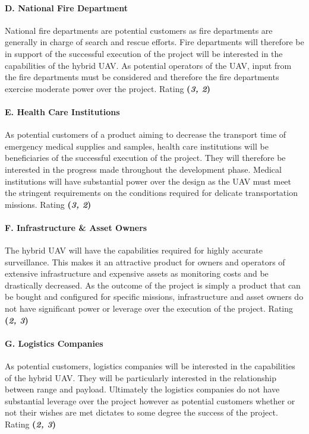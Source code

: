 \paragraph{D. National Fire Department}
National fire departments are potential customers as fire departments are generally in charge of search and rescue efforts. Fire departments will therefore be in support of the successful execution of the project will be interested in the capabilities of the hybrid UAV. As potential operators of the UAV, input from the fire departments must be considered and therefore the fire departments exercise moderate power over the project. Rating \textbf{(\textit{3, 2})} 

\paragraph{E. Health Care Institutions}
As potential customers of a product aiming to decrease the transport time of emergency medical supplies and samples, health care institutions will be beneficiaries of the successful execution of the project. They will therefore be interested in the progress made throughout the development phase. Medical institutions will have substantial power over the design as the UAV must meet the stringent requirements on the conditions required for delicate transportation missions. Rating \textbf{(\textit{3, 2})} 

\paragraph{F. Infrastructure \& Asset Owners}
The hybrid UAV will have the capabilities required for highly accurate surveillance. This makes it an attractive product for owners and operators of extensive infrastructure and expensive assets as monitoring costs and be drastically decreased. As the outcome of the project is simply a product that can be bought and configured for specific missions, infrastructure and asset owners do not have significant power or leverage over the execution of the project. Rating \textbf{(\textit{2, 3})} 

\paragraph{G. Logistics Companies}
As potential customers, logistics companies will be interested in the capabilities of the hybrid UAV. They will be particularly interested in the relationship between range and payload. Ultimately the logistics companies do not have substantial leverage over the project however as potential customers whether or not their wishes are met dictates to some degree the success of the project. Rating \textbf{(\textit{2, 3})} 

